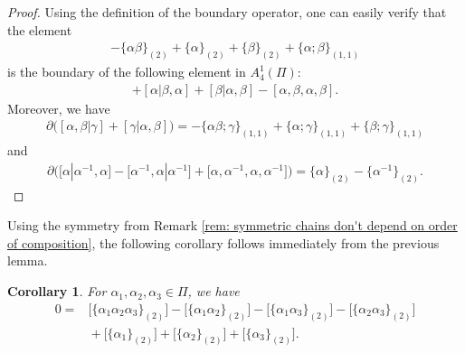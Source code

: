 \documentclass[10pt,a4paper]{amsart}
\numberwithin{equation}{section}
\newtheorem{Corollary}[Theorem]{Corollary}
\begin{document}
\begin{proof}
 Using the definition of the boundary operator, one can easily verify that the element
 \begin{align*}
 -\{\alpha\beta\}_{(2)}+\{\alpha\}_{(2)}+\{\beta\}_{(2)}+\{\alpha;\beta\}_{(1,1)}
 \end{align*}
 is the boundary of the following element in $A_{4}^1(\Pi)$:
 \begin{align*}
 [\alpha,\beta|\alpha\beta]+[\alpha|\beta,\alpha]+[\beta|\alpha,\beta]-[\alpha,\beta,\alpha,\beta].
 \end{align*}
 Moreover, we have
 \begin{align*}
 \partial\big([\alpha,\beta|\gamma]+[\gamma|\alpha,\beta]\big)= -\{\alpha\beta;\gamma\}_{(1,1)}+ \{\alpha;\gamma\}_{(1,1)}+\{\beta;\gamma\}_{(1,1)}
 \end{align*}
 and
 \begin{align*}
 \partial\big( \big[\alpha|\alpha^{-1},\alpha\big]-\big[\alpha^{-1},\alpha|\alpha^{-1}\big]+\big[\alpha,\alpha^{-1},\alpha,\alpha^{-1}\big] \big)=\{\alpha\}_{(2)}-\big\{\alpha^{-1}\big\}_{(2)}.\tag*{\qed}
 \end{align*}
\renewcommand{\qed}{}\end{proof}

Using the symmetry from Remark \ref{rem: symmetric chains don't depend on order of composition}, the following corollary follows immediately from the previous lemma.

\begin{Corollary}\label{cor: n-form for d=1}
 For $\alpha_1,\alpha_2,\alpha_3 \in \Pi$, we have
 \begin{align*}
 0={}&\big[\{\alpha_1\alpha_2\alpha_3\}_{(2)} \big]- \big[\{\alpha_1\alpha_2\}_{(2)} \big]-\big[\{\alpha_1\alpha_3\}_{(2)} \big]-\big[\{\alpha_2\alpha_3\}_{(2)} \big]\\
 &{}+\big[\{\alpha_1\}_{(2)} \big]+\big[\{\alpha_2\}_{(2)} \big]+\big[\{\alpha_3\}_{(2)} \big].
 \end{align*}
\end{Corollary}
\end{document}
